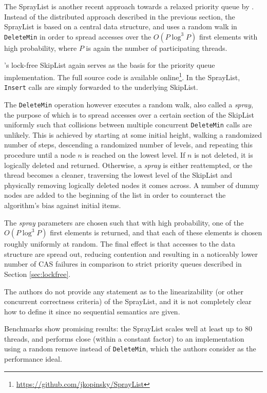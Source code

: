 \documentclass[a4paper,10pt]{article}
\begin{document}
The SprayList is another recent approach towards a relaxed priority queue by \citeauthor{alistarhspraylist}
\cite{alistarhspraylist}. Instead of the distributed approach described in the previous section,
the SprayList is based on a central data structure, and uses a random walk in \lstinline|DeleteMin|
in order to spread accesses over the $O(P \log^3 P)$ first elements with high probability, where $P$
is again the number of participating threads.

\citeauthor{fraser2004practical}'s lock-free SkipList \cite{fraser2004practical} again serves as the
basis for the priority queue implementation. The full source code is available online\footnote{
\url{https://github.com/jkopinsky/SprayList}}. In the SprayList, \lstinline|Insert| calls are simply
forwarded to the underlying SkipList.

The \lstinline|DeleteMin| operation however executes a random walk, also called a \emph{spray}, the
purpose of which is to spread accesses over a certain section of the SkipList uniformly such that
collisions between multiple concurrent \lstinline|DeleteMin| calls are unlikely. This is achieved by
starting at some initial height, walking a randomized number of steps, descending a randomized number of levels,
and repeating this procedure until a node $n$ is reached on the lowest level. If $n$ is not deleted,
it is logically deleted and returned. Otherwise, a \emph{spray} is either reattempted, or the thread
becomes a cleaner, traversing the lowest level of the SkipList and physically removing logically deleted
nodes it comes across. A number of dummy nodes are added to the beginning of the list in order to counteract
the algorithm's bias against initial items.

The \emph{spray} parameters are chosen such that with high probability, one of the $O(P \log^3 P)$
first elements is returned, and that each of these elements is chosen roughly uniformly at random.
The final effect is that accesses to the data structure are spread out, reducing contention and resulting
in a noticeably lower number of \ac{CAS} failures in comparison to strict priority queues described
in Section \ref{sec:lockfree}.

The authors do not provide any statement as to the linearizability (or other concurrent correctness
criteria) of the SprayList, and it is not completely clear how to define it since no
sequential semantics are given.

Benchmarks show promising results: the SprayList scales well at least up to 80 threads,
and performs close (within a constant factor) to an implementation using a random remove instead
of \lstinline|DeleteMin|, which the authors consider as the performance ideal.
\end{document}
